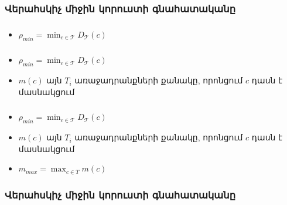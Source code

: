 \documentclass[10pt]{beamer}
\begin{document}
\begin{frame}
\frametitle{\armfont Վերահսկիչ միջին կորուստի գնահատականը}
\end{frame}


\begin{frame}[t]
\frametitle{}
\begin{itemize}
\armfont
\vspace{15mm}
\item $\rho_{min}  = \min_{c \in \mathcal{T} } D_\mathcal{T}(c)$

\end{itemize}
\end{frame}



\begin{frame}[t]
\frametitle{}
\begin{itemize}
\armfont
\vspace{15mm}
\item $\rho_{min}  = \min_{c \in \mathcal{T} } D_\mathcal{T}(c)$
\item $m(c)$ այն $T_i$ առաջադրանքների քանակը, որոնցում $c$ դասն է մասնակցում
\end{itemize}
\end{frame}


\begin{frame}[t]
\frametitle{}
\begin{itemize}
\armfont
\vspace{15mm}
\item $\rho_{min}  = \min_{c \in \mathcal{T} } D_\mathcal{T}(c)$
\item $m(c)$ այն $T_i$ առաջադրանքների քանակը, որոնցում $c$ դասն է մասնակցում
\item $m_{max} = \max_{c \in T} m(c)$
\end{itemize}
\end{frame}




\begin{frame}
\frametitle{\armfont Վերահսկիչ միջին կորուստի գնահատականը}
\end{frame}
\end{document}
